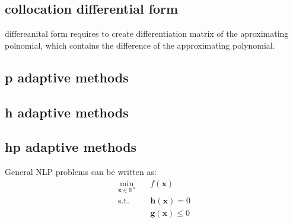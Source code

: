 \subsection{collocation differential form}
differeanital form requires to create differentiation matrix of the aproximating polnomial, which contains the difference of the approximating polynomial.
\subsection{p adaptive methods}
\subsection{h adaptive methods}
\subsection{hp adaptive methods}

General NLP problems can be written as:
\begin{equation}
\begin{aligned}
\min_{\mathbf{x} \in \mathbb{R}^n} \quad & f(\mathbf{x}) \\
\text{s.t.} \quad & \mathbf{h}(\mathbf{x}) = 0 \\
& \mathbf{g}(\mathbf{x}) \leq 0
\end{aligned}
\label{eq:general_nlp}
\end{equation}

